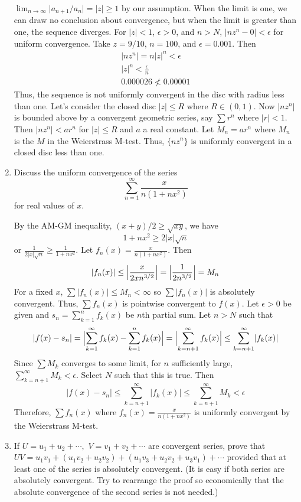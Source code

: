 \begin{enumerate}
  \(\lim_{n\to\infty}\lvert a_{n + 1}/a_n\rvert = \lvert z\rvert\geq 1\) by our
  assumption.
  When the limit is one, we can draw no conclusion about convergence, but when
  the limit is greater than one, the sequence diverges.
  For \(\lvert z\rvert < 1\), \(\epsilon > 0\), and \(n > N\),
  \(\lvert nz^n - 0\rvert < \epsilon\) for uniform convergence.
  Take \(z = 9/10\), \(n = 100\), and \(\epsilon = 0.001\).
  Then
  \begin{gather*}
    \lvert nz^n\rvert = n\lvert z\rvert^n < \epsilon\\
    \lvert z\rvert^n < \frac{\epsilon}{n}\\
    0.000026 \not < 0.00001
  \end{gather*}
  Thus, the sequence is not uniformly convergent in the disc with radius less
  than one.
  Let's consider the closed disc \(\lvert z\rvert\leq R\) where \(R\in(0,1)\).
  Now \(\lvert nz^n\rvert\) is bounded above by a convergent geometric series,
  say \(\sum r^n\) where \(\lvert r\rvert < 1\).
  Then \(\lvert nz^n\rvert < ar^n\) for \(\lvert z\rvert\leq R\) and \(a\) a
  real constant.
  Let \(M_n = ar^n\) where \(M_n\) is the \(M\) in the Weierstrass M-test.
  Thus, \(\{nz^n\}\) is uniformly convergent in a closed disc less than one.
\item
  Discuss the uniform convergence of the series
  \[
  \sum_{n = 1}^{\infty}\frac{x}{n(1 + nx^2)}
  \]
  for real values of \(x\).
  \par\smallskip
  By the AM-GM inequality, \((x + y)/2\geq \sqrt{xy}\), we have
  \[
  1 + nx^2\geq 2\lvert x\rvert\sqrt{n}
  \]
  or \(\frac{1}{2\lvert x\rvert\sqrt{n}}\geq\frac{1}{1 + nx^2}\).
  Let \(f_n(x) = \frac{x}{n(1 + nx^2)}\).
  Then
  \[
  \lvert f_n(x)\rvert\leq \Bigl\lvert\frac{x}{2xn^{3/2}}\Bigr\rvert =
  \Bigl\lvert\frac{1}{2n^{3/2}}\Bigr\rvert = M_n
  \]
  For a fixed \(x\), \(\sum\lvert f_n(x)\rvert\leq M_n < \infty\) so
  \(\sum\lvert f_n(x)\rvert\) is absolutely convergent.
  Thus, \(\sum f_n(x)\) is pointwise convergent to \(f(x)\).
  Let \(\epsilon > 0\) be given and \(s_n = \sum_{k = 1}^nf_k(x)\) be \(n\)th
  partial sum.
  Let \(n > N\) such that
  \[
  \lvert f(x) - s_n\rvert = \Bigl\lvert\sum_{k = 1}^{\infty}f_k(x) -
  \sum_{k = 1}^nf_k(x)\Bigr\rvert =
  \Bigl\lvert\sum_{k = n + 1}^{\infty}f_k(x)\Bigr\rvert\leq
  \sum_{k = n + 1}^{\infty}\lvert f_k(x)\rvert
  \]
  Since \(\sum M_k\) converges to some limit, for \(n\) sufficiently large,
  \(\sum_{k = n + 1}^{\infty}M_k < \epsilon\).
  Select \(N\) such that this is true.
  Then
  \[
  \lvert f(x) - s_n\rvert\leq\sum_{k = n + 1}^{\infty}\lvert f_k(x)\rvert\leq
  \sum_{k = n + 1}^{\infty}M_k < \epsilon
  \]
  Therefore, \(\sum f_n(x)\) where \(f_n(x) = \frac{x}{n(1 + nx^2)}\) is
  uniformly convergent by the Weierstrass M-test.
\item
  If \(U = u_1 + u_2 + \cdots,\) \(V = v_1 + v_2 + \cdots\) are convergent
  series, prove that
  \(UV = u_1v_1 + (u_1v_2 + u_2v_2) + (u_1v_3 + u_2v_2 + u_3v_1) + \cdots\)
  provided that at least one of the series is absolutely convergent.
  (It is easy if both series are absolutely convergent.
  Try to rearrange the proof so economically that the absolute convergence of
  the second series is not needed.)
\end{enumerate}

